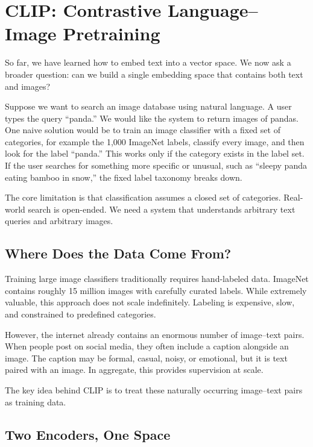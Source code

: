 \section{CLIP: Contrastive Language–Image Pretraining}
\medskip

So far, we have learned how to embed text into a vector space. We now ask a broader question: can we build a single embedding space that contains both text and images?

Suppose we want to search an image database using natural language. A user types the query ``panda.'' We would like the system to return images of pandas. One naive solution would be to train an image classifier with a fixed set of categories, for example the 1,000 ImageNet labels, classify every image, and then look for the label ``panda.'' This works only if the category exists in the label set. If the user searches for something more specific or unusual, such as ``sleepy panda eating bamboo in snow,'' the fixed label taxonomy breaks down.

The core limitation is that classification assumes a closed set of categories. Real-world search is open-ended. We need a system that understands arbitrary text queries and arbitrary images.

\bigskip
\subsection{Where Does the Data Come From?}
\medskip

Training large image classifiers traditionally requires hand-labeled data. ImageNet contains roughly 15 million images with carefully curated labels. While extremely valuable, this approach does not scale indefinitely. Labeling is expensive, slow, and constrained to predefined categories.

However, the internet already contains an enormous number of image–text pairs. When people post on social media, they often include a caption alongside an image. The caption may be formal, casual, noisy, or emotional, but it is text paired with an image. In aggregate, this provides supervision at scale.

The key idea behind CLIP is to treat these naturally occurring image–text pairs as training data.

\bigskip
\subsection{Two Encoders, One Space}
\medskip

